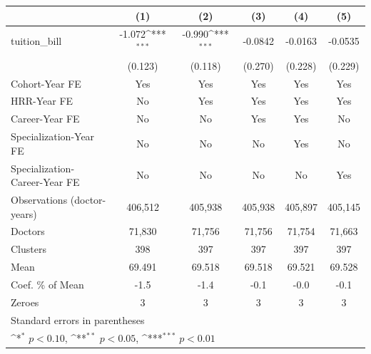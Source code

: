 {
\def\sym#1{\ifmmode^{#1}\else\(^{#1}\)\fi}
\begin{tabular}{l*{5}{c}}
\hline\hline
                    &\multicolumn{1}{c}{(1)}         &\multicolumn{1}{c}{(2)}         &\multicolumn{1}{c}{(3)}         &\multicolumn{1}{c}{(4)}         &\multicolumn{1}{c}{(5)}         \\
\hline
tuition\_bill        &      -1.072\sym{***}&      -0.990\sym{***}&     -0.0842         &     -0.0163         &     -0.0535         \\
                    &     (0.123)         &     (0.118)         &     (0.270)         &     (0.228)         &     (0.229)         \\
[1em]
Cohort-Year FE      &         Yes         &         Yes         &         Yes         &         Yes         &         Yes         \\
[1em]
HRR-Year FE         &          No         &         Yes         &         Yes         &         Yes         &         Yes         \\
[1em]
Career-Year FE      &          No         &          No         &         Yes         &         Yes         &          No         \\
[1em]
Specialization-Year FE&          No         &          No         &          No         &         Yes         &          No         \\
[1em]
Specialization-Career-Year FE&          No         &          No         &          No         &          No         &         Yes         \\
\hline
Observations (doctor-years)&     406,512         &     405,938         &     405,938         &     405,897         &     405,145         \\
Doctors             &      71,830         &      71,756         &      71,756         &      71,754         &      71,663         \\
Clusters            &         398         &         397         &         397         &         397         &         397         \\
Mean                &      69.491         &      69.518         &      69.518         &      69.521         &      69.528         \\
Coef. \% of Mean    &        -1.5         &        -1.4         &        -0.1         &        -0.0         &        -0.1         \\
Zeroes              &           3         &           3         &           3         &           3         &           3         \\
\hline\hline
\multicolumn{6}{l}{\footnotesize Standard errors in parentheses}\\
\multicolumn{6}{l}{\footnotesize \sym{*} \(p<0.10\), \sym{**} \(p<0.05\), \sym{***} \(p<0.01\)}\\
\end{tabular}
}

